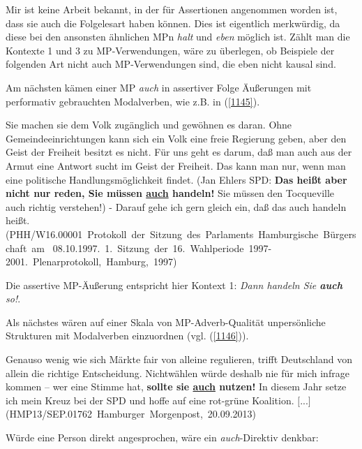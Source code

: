 {Mir ist keine Arbeit bekannt, in der für Assertionen angenommen worden ist, dass sie auch die Folgelesart haben können. Dies ist eigentlich merkwürdig, da diese bei den ansonsten ähnlichen MPn \textit{halt} und \textit{eben} möglich ist. Zählt man die Kontexte 1 und 3 zu MP-Verwendungen, wäre zu überlegen, ob Beispiele der folgenden Art nicht auch MP-Verwendungen sind, die eben nicht kausal sind. 

Am nächsten kämen einer MP \textit{auch} in assertiver Folge Äußerungen mit performativ gebrauchten  Modalverben, wie z.B. in (\ref{1145}).

\begin{exe}
	\ex\label{1145} 
	\scriptsize
 	Sie machen sie dem Volk zugänglich und gewöhnen es daran. Ohne Gemeindeeinrichtungen kann sich ein Volk eine freie Regierung geben, aber den Geist der 		Freiheit besitzt es nicht. Für uns geht es darum, daß man auch aus der Armut eine Antwort sucht im Geist der Freiheit. Das kann man nur, wenn man eine 		politische Handlungsmöglichkeit findet. (Jan Ehlers SPD: \textbf{Das heißt aber nicht nur reden, Sie müssen \underline{auch} handeln!} Sie müssen den 		Tocqueville auch richtig verstehen!) - Darauf gehe ich gern gleich ein, daß das auch handeln heißt. 
	\newline
	\hbox{}\hfill\hbox{(PHH/W16.00001 Protokoll der Sitzung des Parlaments Hamburgische Bürgerschaft am}
	\newline
	\hbox{}\hfill\hbox{ 08.10.1997. 1. Sitzung der 16. Wahlperiode 1997-2001. Plenarprotokoll, Hamburg, 1997)}
\end{exe}
Die assertive MP-Äußerung entspricht hier Kontext 1: \textit{Dann handeln Sie \textbf{auch} so!}.

Als nächstes wären auf einer \glq Skala\grq {} von MP-Adverb-Qualität unpersönliche Strukturen mit Modalverben einzuordnen (vgl. (\ref{1146})).

\begin{exe}
	\ex\label{1146} 
	\scriptsize
 	\glqq Genauso wenig wie sich Märkte fair von alleine regulieren, trifft Deutschland von allein die richtige Entscheidung. Nichtwählen würde deshalb nie 	für mich infrage kommen – wer eine Stimme hat, \textbf{sollte sie \underline{auch} nutzen!} In diesem Jahr setze ich mein Kreuz bei der SPD und hoffe 		auf eine rot-grüne Koalition. $[$...$]$\grqq{}	
	\hfill\hbox{(HMP13/SEP.01762 Hamburger Morgenpost, 20.09.2013)}
\end{exe}
Würde eine Person direkt angesprochen, wäre ein \textit{auch}-Direktiv denkbar:

}
